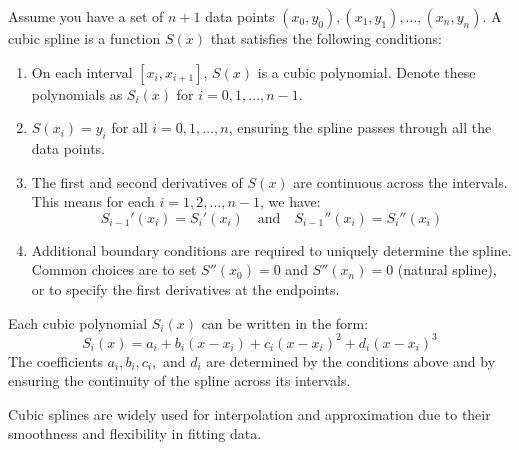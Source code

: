 \documentclass{article}
\begin{document}
Assume you have a set of \( n+1 \) data points \( (x_0, y_0), (x_1, y_1), \ldots, (x_n, y_n) \). A cubic spline is a function \( S(x) \) that satisfies the following conditions:

\begin{enumerate}
    \item On each interval \([x_i, x_{i+1}]\), \( S(x) \) is a cubic polynomial. Denote these polynomials as \( S_i(x) \) for \( i = 0, 1, \ldots, n-1 \).
    \item \( S(x_i) = y_i \) for all \( i = 0, 1, \ldots, n \), ensuring the spline passes through all the data points.
    \item The first and second derivatives of \( S(x) \) are continuous across the intervals. This means for each \( i = 1, 2, \ldots, n-1 \), we have:
    \[
    S_{i-1}'(x_i) = S_i'(x_i) \quad \text{and} \quad S_{i-1}''(x_i) = S_i''(x_i)
    \]
    \item Additional boundary conditions are required to uniquely determine the spline. Common choices are to set \( S''(x_0) = 0 \) and \( S''(x_n) = 0 \) (natural spline), or to specify the first derivatives at the endpoints.
\end{enumerate}

Each cubic polynomial \( S_i(x) \) can be written in the form:
\[
S_i(x) = a_i + b_i(x - x_i) + c_i(x - x_i)^2 + d_i(x - x_i)^3
\]
The coefficients \( a_i, b_i, c_i, \) and \( d_i \) are determined by the conditions above and by ensuring the continuity of the spline across its intervals.

Cubic splines are widely used for interpolation and approximation due to their smoothness and flexibility in fitting data.
\end{document}
